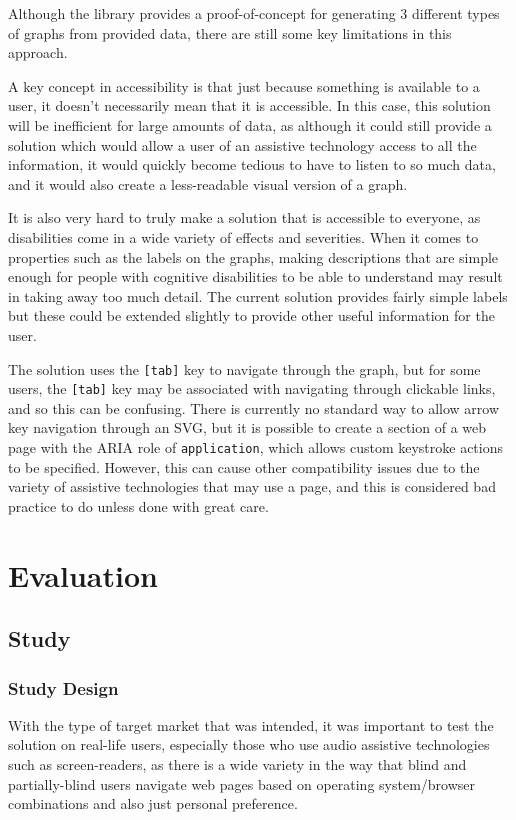 \documentclass[ %
                    author={Aleena Baig},
                supervisor={Dr Simon Lock},
                    degree={BSc},
                     title={On Making Web Accessible Graphs},
                  subtitle={},
                      year={2019} ]{dissertation}
\begin{document}
Although the library provides a proof-of-concept for generating 3 different types of graphs from provided data, there are still some key limitations in this approach.

A key concept in accessibility is that just because something is available to a user, it doesn't necessarily mean that it is accessible. In this case, this solution will be inefficient for large amounts of data, as although it could still provide a solution which would allow a user of an assistive technology access to all the information, it would quickly become tedious to have to listen to so much data, and it would also create a less-readable visual version of a graph.

It is also very hard to truly make a solution that is accessible to everyone, as disabilities come in a wide variety of effects and severities. When it comes to properties such as the labels on the graphs, making descriptions that are simple enough for people with cognitive disabilities to be able to understand may result in taking away too much detail. The current solution provides fairly simple labels but these could be extended slightly to provide other useful information for the user.

The solution uses the \texttt{[tab]} key to navigate through the graph, but for some users, the \texttt{[tab]} key may be associated with navigating through clickable links, and so this can be confusing. There is currently no standard way to allow arrow key navigation through an SVG, but it is possible to create a section of a web page with the ARIA role of \texttt{application}, which allows custom keystroke actions to be specified. However, this can cause other compatibility issues due to the variety of assistive technologies that may use a page, and this is considered bad practice to do unless done with great care.

\chapter{Evaluation}

\section{Study}

\subsection{Study Design}

With the type of target market that was intended, it was important to test the solution on real-life users, especially those who use audio assistive technologies such as screen-readers, as there is a wide variety in the way that blind and partially-blind users navigate web pages based on operating system/browser combinations and also just personal preference.
\end{document}
